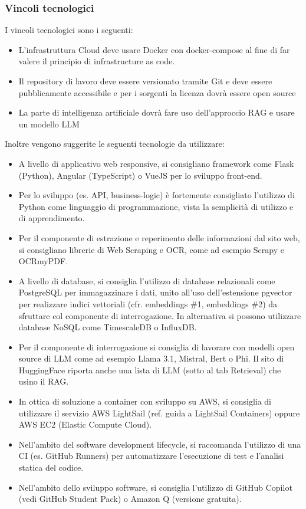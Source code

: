 \subsubsection{Vincoli tecnologici}
I vincoli tecnologici sono i seguenti:
\begin{itemize}
    \item L’infrastruttura Cloud deve usare Docker con docker-compose al fine di far valere il
    principio di infrastructure as code.
    \item Il repository di lavoro deve essere versionato tramite Git e deve essere pubblicamente
    accessibile e per i sorgenti la licenza dovrà essere open
    source
    \item La parte di intelligenza artificiale dovrà fare uso dell’approccio RAG e usare un modello LLM
\end{itemize}
Inoltre vengono suggerite le seguenti tecnologie da utilizzare:
\begin{itemize}
    \item A livello di applicativo web responsive, si consigliano framework come Flask (Python), Angular
    (TypeScript) o VueJS per lo sviluppo front-end.
    \item Per lo sviluppo (es. API, business-logic) è fortemente consigliato l’utilizzo di Python come
    linguaggio di programmazione, vista la semplicità di utilizzo e di apprendimento.
    \item Per il componente di estrazione e reperimento delle informazioni dal sito web, si consigliano
    librerie di Web Scraping e OCR, come ad esempio Scrapy e OCRmyPDF.
    \item A livello di database, si consiglia l’utilizzo di database relazionali come PostgreSQL per
    immagazzinare i dati, unito all’uso dell’estensione pgvector per realizzare indici vettoriali (cfr.
    embeddings \#1, embeddings \#2) da sfruttare col componente di interrogazione. In alternativa si
    possono utilizzare database NoSQL come TimescaleDB o InfluxDB.
    \item Per il componente di interrogazione si consiglia di lavorare con modelli open source di LLM come
    ad esempio Llama 3.1, Mistral, Bert o Phi. Il sito di HuggingFace riporta anche una lista di LLM
    (sotto al tab Retrieval) che usino il RAG.
    \item In ottica di soluzione a container con sviluppo su AWS, si consiglia di utilizzare il servizio AWS
    LightSail (ref. guida a LightSail Containers) oppure AWS EC2 (Elastic Compute Cloud).
    \item Nell’ambito del software development lifecycle, si raccomanda l’utilizzo di una CI (es. GitHub
    Runners) per automatizzare l’esecuzione di test e l’analisi statica del codice.
    \item Nell’ambito dello sviluppo software, si consiglia l’utilizzo di GitHub Copilot (vedi GitHub Student
    Pack) o Amazon Q (versione gratuita).
\end{itemize}
